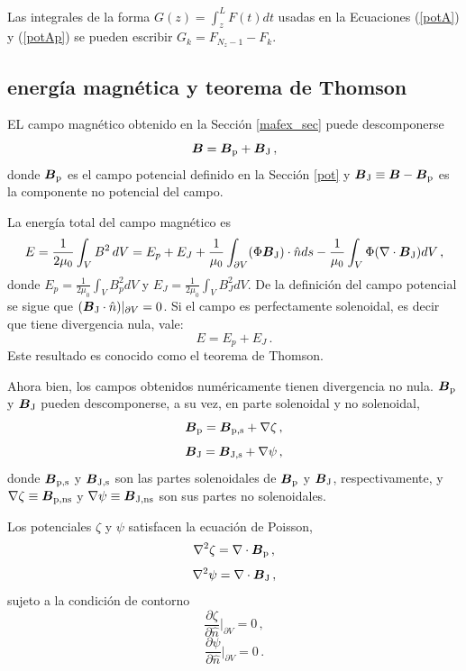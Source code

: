 \documentclass[a4paper,10pt]{article}
\def\bB{{\boldsymbol{B}}}
\def\eqs#1#2{Ecuaciones (\ref{#1}) y (\ref{#2})}
\def\bBp{\boldsymbol{B}_{\rm p}}
\def\bBj{\boldsymbol{B}_{\rm J}}
\def\bBps{\boldsymbol{B}_{\rm p,s}}
\def\bBjs{\boldsymbol{B}_{\rm J,s}}
\def\bBpns{\boldsymbol{B}_{\rm p,ns}}
\def\bBjns{\boldsymbol{B}_{\rm J,ns}}
\def\dn#1{\frac{\partial #1}{\partial {\hat n}}}
\begin{document}
Las integrales de la forma $G(z)= \int_z^L F(t) dt$ usadas en la \eqs{potA}{potAp} se pueden escribir $G_k = F_{N_z-1}-F_k$. 

 

\subsection{energía magnética y teorema de Thomson}

EL campo magnético obtenido en la Sección \ref{mafex_sec} puede descomponerse
\begin{equation}
 \bB = \bBp + \bBj \,,
\end{equation}
donde $\bBp$ es el campo potencial definido en la Sección \ref{pot} y $\bBj\equiv \bB - \bBp$ es la componente no potencial del campo.

La energía total del campo magnético es
\begin{equation}
 E = \frac{1}{2\mu_0}\int_V B^2 \,dV = E_p + E_J + \frac{1}{\mu_0}\int_{\partial V} (\Phi \bBj) \cdot \hat n ds - \frac{1}{\mu_0}\int_{V} \Phi( \nabla \cdot \bBj) dV \,,
\end{equation}
donde $E_p=\frac{1}{2\mu_0}\int_V B_p^2 dV$ y $E_J=\frac{1}{2\mu_0}\int_V B_J^2 dV$. De la definición del campo potencial se sigue que $(\bBj \cdot \hat n) \rvert_{\partial V}= 0$. Si el campo es perfectamente solenoidal, es decir que tiene divergencia nula, vale:
\begin{equation}
 E = E_p + E_J \,.
\end{equation}
Este resultado es conocido como el teorema de Thomson.

Ahora bien, los campos obtenidos numéricamente tienen divergencia no nula. $\bBp$ y $\bBj$ pueden descomponerse, a su vez, en parte solenoidal y no solenoidal,
\begin{equation}
 \bBp = \bBps  + \nabla \zeta \,,
\end{equation}
\begin{equation}
  \bBj = \bBjs+ \nabla \psi \,,
\end{equation}
donde $\bBps$ y $\bBjs$ son las partes solenoidales de $\bBp$ y $\bBj$, respectivamente, y  $\nabla \zeta \equiv \bBpns$ y $\nabla \psi \equiv \bBjns$ son sus partes no solenoidales.

Los potenciales $\zeta$ y $\psi$ satisfacen la ecuación de Poisson,
\begin{equation}
 \nabla^2 \zeta = \nabla \cdot \bBp \,,
\end{equation}
\begin{equation}
 \nabla^2 \psi = \nabla \cdot \bBj \,,
\end{equation}
sujeto a la condición de contorno
\begin{equation}
 \dn{\zeta}\rvert_{\partial V}=0 \,,
\end{equation}
\begin{equation}
 \dn{\psi}\rvert_{\partial V}=0 \,.
\end{equation}
\end{document}
